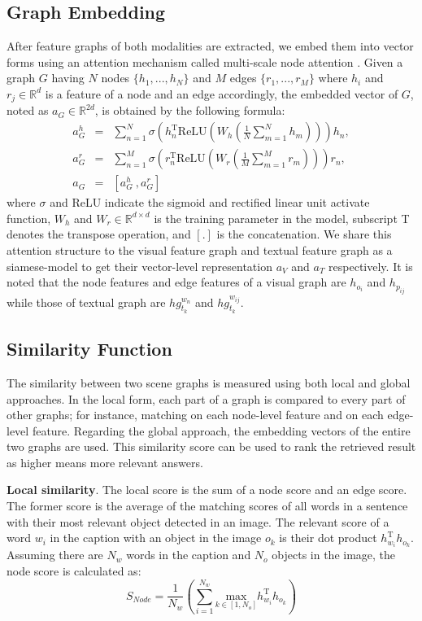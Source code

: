 \documentclass{IOS-Book-Article}
\begin{document}
\subsection{Graph Embedding}
After feature graphs of both modalities are extracted, we embed them into vector forms using an attention mechanism called multi-scale node attention \cite{bai2019unsupervised}. Given a graph $G$ having $N$ nodes $\{h_1, ..., h_N\}$ and $M$ edges $\{r_1,...,r_M\}$ where $h_i$ and $r_j \in \mathbb{R}^d$ is a feature of a node and an edge accordingly, the embedded vector of $G$, noted as $a_G \in \mathbb{R}^{2d}$, is obtained by the following formula:
\begin{eqnarray}
    a^{h}_G &=& \sum_{n=1}^{N} \sigma (h^\text{T}_n\text{ReLU}(W_h(\frac{1}{N}\sum_{m=1}^{N}h_m)))h_n,\\
    a^{r}_G &=& \sum_{n=1}^{M} \sigma (r^\text{T}_n\text{ReLU}(W_r(\frac{1}{M}\sum_{m=1}^{M}r_m)))r_n,\\
    a_G &=& [a^{h}_G\:, a^{r}_G]
\end{eqnarray}
where $\sigma$ and ReLU indicate the sigmoid and rectified linear unit activate function, $W_h$ and $W_r \in \mathbb{R}^{d \times d}$ is the training parameter in the model, subscript T denotes the transpose operation, and $[.]$ is the concatenation. We share this attention structure to the visual feature graph and textual feature graph as a siamese-model to get their vector-level representation $a_V$ and $a_T$ respectively. It is noted that the node features and edge features of a visual graph are $h_{o_i}$ and $h_{p_{ij}}$ while those of textual graph are $hg^{w_n}_{t_k}$ and $hg^{w_{ij}}_{t_k}$.

\subsection{Similarity Function}
The similarity between two scene graphs is measured using both local and global approaches. In the local form, each part of a graph is compared to every part of other graphs; for instance, matching on each node-level feature and on each edge-level feature. Regarding the global approach, the embedding vectors of the entire two graphs are used. This similarity score can be used to rank the retrieved result as higher means more relevant answers.

\textbf{Local similarity}. The local score is the sum of a node score and an edge score. The former score is the average of the matching scores of all words in a sentence with their most relevant object detected in an image. The relevant score of a word $w_i$ in the caption with an object in the image $o_k$ is their dot product $h_{w_i}^\text{T}h_{o_k}$. Assuming there are $N_w$ words in the caption and $N_o$ objects in the image, the node score is calculated as:
\begin{equation}
    S_{Node} = \frac{1}{N_w} \left(\sum_{i=1}^{N_w}\underset{k\in[1,N_o]}{\mathrm{max}}h_{w_i}^\text{T}h_{o_k}\right)
\end{equation}
\end{document}
